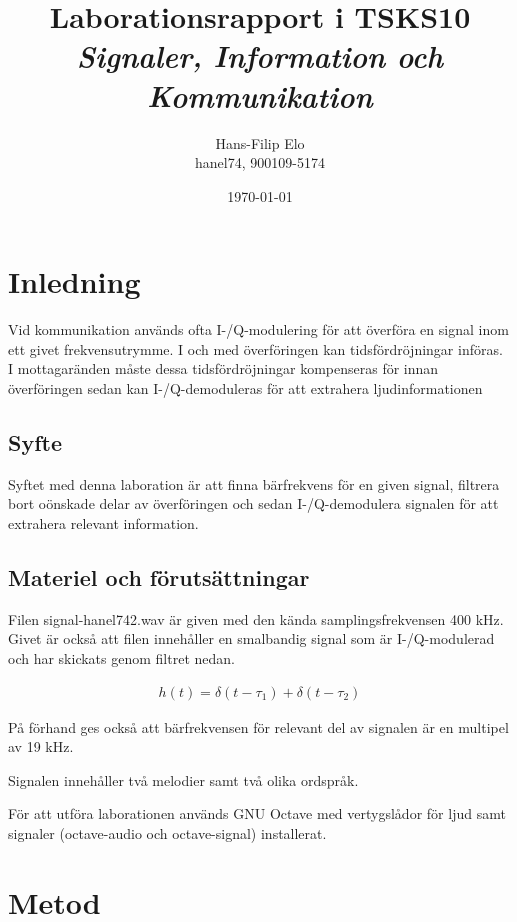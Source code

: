 \documentclass[10pt]{article}
\title{Laborationsrapport i TSKS10 \emph{Signaler, Information och Kommunikation}}
\author{Hans-Filip Elo \\ hanel74, 900109-5174 }
\date{\today}
\begin{document}
\maketitle

\twocolumn

\section{Inledning}

Vid kommunikation används ofta I-/Q-modulering för att överföra en signal inom ett givet frekvensutrymme. I och med överföringen kan tidsfördröjningar införas. I mottagaränden måste dessa tidsfördröjningar kompenseras för innan överföringen sedan kan I-/Q-demoduleras för att extrahera ljudinformationen 

\subsection{Syfte}

Syftet med denna laboration är att finna bärfrekvens för en given signal, filtrera bort oönskade delar av överföringen och sedan I-/Q-demodulera signalen för att extrahera relevant information. 

\subsection{Materiel och förutsättningar}

Filen signal-hanel742.wav är given med den kända samplingsfrekvensen 400 kHz. Givet är också att filen innehåller en smalbandig signal som är I-/Q-modulerad och har skickats genom filtret nedan. 

\begin{gather}
h(t) = \delta(t - \tau_1) + \delta(t - \tau_2)
\label{equ:filter}
\end{gather}

På förhand ges också att bärfrekvensen för relevant del av signalen är en multipel av 19 kHz.

Signalen innehåller två melodier samt två olika ordspråk. 

För att utföra laborationen används GNU Octave med vertygslådor för ljud samt signaler (octave-audio och octave-signal) installerat. 

\section{Metod}
\end{document}
